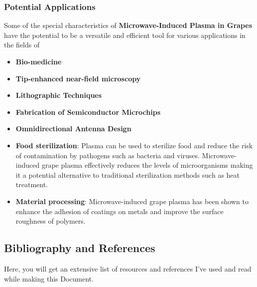 \documentclass{article}
\begin{document}
\subsubsection{\large Potential Applications}
Some of the special characteristics of \textbf{Microwave-Induced Plasma in Grapes} have the potential to be a versatile and efficient tool for various applications in the fields of
\begin{itemize}
    
   
    \item \textbf{ Bio-medicine}
    \item \textbf{ Tip-enhanced near-field microscopy}
    \item \textbf{ Lithographic Techniques}
    \item \textbf{ Fabrication of Semiconductor Microchips}
    \item \textbf{ Omnidirectional Antenna Design}
    \item \textbf{ Food sterilization}:  {Plasma can be used to sterilize food and reduce the risk of contamination by pathogens such as bacteria and viruses. Microwave-induced grape plasma effectively reduces the levels of microorganisms making it a potential alternative to traditional sterilization methods such as heat treatment.}
    \item \textbf{{Material processing}}: {Microwave-induced grape plasma has been shown to enhance the adhesion of coatings on metals  and improve the surface roughness of polymers.}
    
    

\end{itemize}




\subsection{Bibliography and References}

Here, you will get an extensive list of resources and references I've used and read while making this Document.



\end{document}
